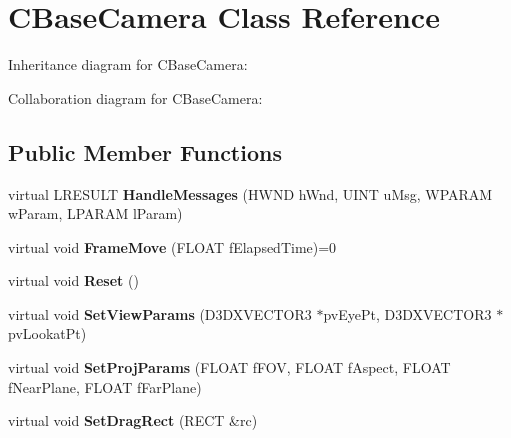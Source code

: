 \hypertarget{class_c_base_camera}{\section{C\+Base\+Camera Class Reference}
\label{class_c_base_camera}
}


Inheritance diagram for C\+Base\+Camera\+:


Collaboration diagram for C\+Base\+Camera\+:
\subsection*{Public Member Functions}
\begin{DoxyCompactItemize}
\item 
\hypertarget{class_c_base_camera_a77cc040ed2d0b3479412b81316beb793}{virtual L\+R\+E\+S\+U\+L\+T {\bfseries Handle\+Messages} (H\+W\+N\+D h\+Wnd, U\+I\+N\+T u\+Msg, W\+P\+A\+R\+A\+M w\+Param, L\+P\+A\+R\+A\+M l\+Param)}\label{class_c_base_camera_a77cc040ed2d0b3479412b81316beb793}

\item 
\hypertarget{class_c_base_camera_a21db15a8cdca60d1540d958a32708703}{virtual void {\bfseries Frame\+Move} (F\+L\+O\+A\+T f\+Elapsed\+Time)=0}\label{class_c_base_camera_a21db15a8cdca60d1540d958a32708703}

\item 
\hypertarget{class_c_base_camera_adc95e71e268d59a084f6e8d95a9aadb9}{virtual void {\bfseries Reset} ()}\label{class_c_base_camera_adc95e71e268d59a084f6e8d95a9aadb9}

\item 
\hypertarget{class_c_base_camera_a17b45dd3b6055bc761058d57f5a10c02}{virtual void {\bfseries Set\+View\+Params} (D3\+D\+X\+V\+E\+C\+T\+O\+R3 $\ast$pv\+Eye\+Pt, D3\+D\+X\+V\+E\+C\+T\+O\+R3 $\ast$pv\+Lookat\+Pt)}\label{class_c_base_camera_a17b45dd3b6055bc761058d57f5a10c02}

\item 
\hypertarget{class_c_base_camera_a08cfa8a4246cd6115e6522821e573e89}{virtual void {\bfseries Set\+Proj\+Params} (F\+L\+O\+A\+T f\+F\+O\+V, F\+L\+O\+A\+T f\+Aspect, F\+L\+O\+A\+T f\+Near\+Plane, F\+L\+O\+A\+T f\+Far\+Plane)}\label{class_c_base_camera_a08cfa8a4246cd6115e6522821e573e89}

\item 
\hypertarget{class_c_base_camera_a8c425184f1114f17bb8e1b3505c13036}{virtual void {\bfseries Set\+Drag\+Rect} (R\+E\+C\+T \&rc)}\label{class_c_base_camera_a8c425184f1114f17bb8e1b3505c13036}


\end{DoxyCompactItemize}
